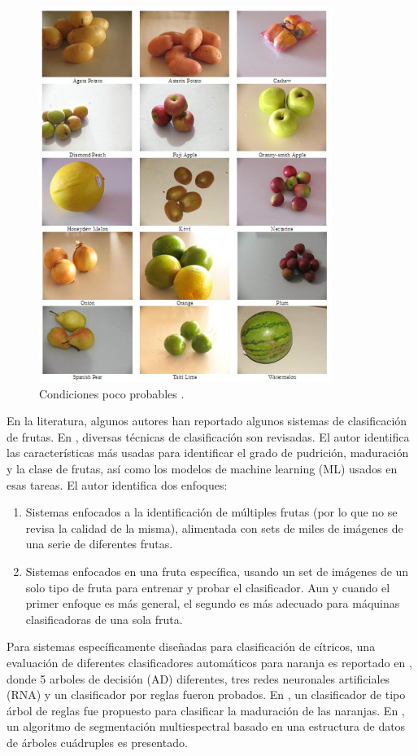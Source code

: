 \documentclass[twoside,spanish,ESP,MSc]{plantillaLabUPV}
\theoremstyle{definition}
\begin{document}
\begin{figure}[!tbh]
	\centering
	\includegraphics*[scale=0.5]{datchafa} 
	\caption{Condiciones poco probables \cite{chafafrut}.}
	\label{chafa}
\end{figure}

En la literatura, algunos autores han reportado algunos sistemas de clasificación de frutas. En  \cite{7306754}, diversas técnicas de clasificación son revisadas. El autor identifica las características más usadas para identificar el grado de pudrición, maduración y la clase de frutas, así como los modelos de machine learning (ML) usados en esas tareas. El autor identifica dos enfoques: 


\begin{enumerate}
	\itemsep 0em
	\item Sistemas enfocados a la identificación de múltiples frutas (por lo que no se revisa la calidad de la misma), alimentada con sets de miles de imágenes de una serie de diferentes frutas. 
	\item Sistemas enfocados en una fruta específica, usando un set de imágenes de un solo tipo de fruta para entrenar y probar el clasificador. Aun y cuando el primer enfoque es más general, el segundo es más adecuado para máquinas clasificadoras de una sola fruta.
\end{enumerate}

Para sistemas específicamente diseñadas para clasificación de cítricos, una evaluación de diferentes clasificadores automáticos para naranja es reportado en \cite{analis}, donde 5 arboles de decisión (AD) diferentes, tres redes neuronales artificiales (RNA) y un clasificador por reglas fueron probados. En \cite{chokun}, un clasificador de tipo árbol de reglas fue propuesto para clasificar la maduración de las naranjas. En \cite{Martinez-Uso:2005:MIS:1565835.1565847}, un algoritmo de segmentación multiespectral basado en una estructura de datos de árboles cuádruples es presentado. 
\end{document}
